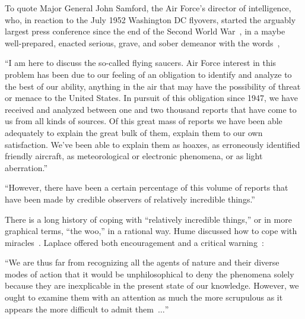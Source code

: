 To quote Major General John Samford, the Air Force's director of intelligence, who,
in reaction to the July 1952 Washington DC flyovers,
started the arguably largest press conference since the end of the Second World War~\cite{Lewis-Kraus2021Apr},
in a maybe well-prepared, enacted serious, grave, and sober demeanor with the words~\cite{Archives1952,Samford1952},
\begin{svgraybox}
``I am here to discuss the so-called flying saucers.
Air Force interest in this problem has been due to our feeling of an obligation to identify and analyze to the best of our ability,
anything in the air that may have the possibility of threat or menace to the United States.
In pursuit of this obligation since 1947,
we have received and analyzed between one and two thousand reports that have come to us from all kinds of sources.
Of this great mass of reports we have been able adequately to explain the great bulk of them, explain them to our own satisfaction.
We've been able to explain them as hoaxes, as erroneously identified friendly aircraft,
as meteorological or electronic phenomena, or as light aberration.''

``However, there have been a certain percentage of this volume of reports that have been made by credible observers of relatively incredible things.''
\end{svgraybox}

There is a long history of coping with ``relatively incredible things,'' or in more graphical terms, ``the woo,'' in a rational way.
Hume discussed how to cope with miracles~\cite{Hume-Enquiry,frank,franke}.
Laplace offered both encouragement and a critical warning~\cite{Laplace1814,Flournoy1900}:
\begin{svgraybox}
``We are thus far from recognizing all the agents of nature and their diverse modes of action
that it would be unphilosophical to deny the phenomena solely because they are inexplicable in the present state of our knowledge.
However, we ought
to examine them with an attention as much the more scrupulous as it appears the more difficult to admit them~$\ldots$''
\end{svgraybox}




